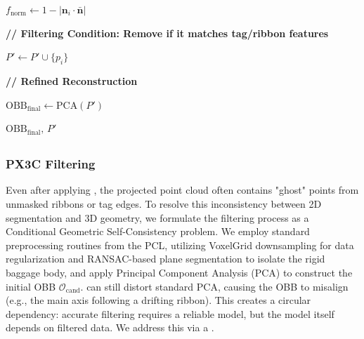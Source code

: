 \begin{algorithm}[t]
\begin{algorithmic}[1]
    \State
    $f_{\text{norm}}
    \gets
    1-\left|\boldsymbol n_i\cdot\bar{\boldsymbol n}\right|$

    \State \textbf{// Filtering Condition: Remove if it matches tag/ribbon features}


        \State $P' \gets P' \cup \{p_i\}$

    \EndIf

\EndFor

\State \textbf{// Refined Reconstruction}

\State $\mathrm{OBB}_{\text{final}} \gets \mathrm{PCA}(P')$

\State \Return $\mathrm{OBB}_{\text{final}},\,P'$

\end{algorithmic}
\end{algorithm}

\subsection{}
\subsubsection{PX3C Filtering}
Even after applying , the projected point cloud often contains "ghost" points from unmasked ribbons or tag edges. To resolve this inconsistency between 2D segmentation and 3D geometry, we formulate the filtering process as a Conditional Geometric Self-Consistency problem. We employ standard preprocessing routines from the PCL, utilizing VoxelGrid downsampling for data regularization and RANSAC-based plane segmentation to isolate the rigid baggage body, and apply Principal Component Analysis (PCA) to construct the initial OBB $\mathcal{O}_{\text{cand}}$.  can still distort standard PCA, causing the OBB to misalign (e.g., the main axis following a drifting ribbon). This creates a circular dependency: accurate filtering requires a reliable model, but the model itself depends on filtered data. We address this via a  .

